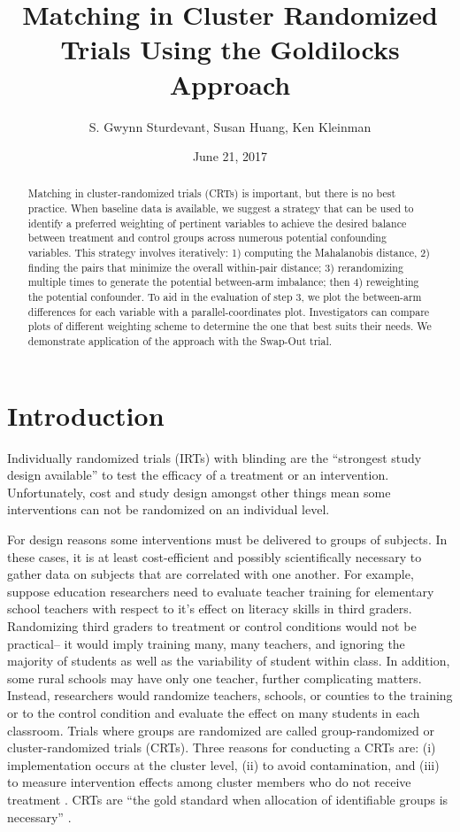 \documentclass[]{article}
\title{Matching in Cluster Randomized Trials Using the Goldilocks Approach}
\author{S. Gwynn Sturdevant, Susan Huang, Ken Kleinman}
\date{June 21, 2017}
\begin{document}
\maketitle
\begin{abstract}
Matching in cluster-randomized trials (CRTs) is important, but there is
no best practice. When baseline data is available, we suggest a strategy
that can be used to identify a preferred weighting of pertinent
variables to achieve the desired balance between treatment and control
groups across numerous potential confounding variables. This strategy
involves iteratively: 1) computing the Mahalanobis distance, 2) finding
the pairs that minimize the overall within-pair distance; 3)
rerandomizing multiple times to generate the potential between-arm
imbalance; then 4) reweighting the potential confounder. To aid in the
evaluation of step 3, we plot the between-arm differences for each
variable with a parallel-coordinates plot. Investigators can compare
plots of different weighting scheme to determine the one that best suits
their needs. We demonstrate application of the approach with the
Swap-Out trial.
\end{abstract}

\section{Introduction}\label{introduction}

Individually randomized trials (IRTs) with blinding are the ``strongest
study design available'' \citep{gatsonis2017methods} to test the
efficacy of a treatment or an intervention. Unfortunately, cost and
study design amongst other things mean some interventions can not be
randomized on an individual level.

For design reasons some interventions must be delivered to groups of
subjects. In these cases, it is at least cost-efficient and possibly
scientifically necessary to gather data on subjects that are correlated
with one another. For example, suppose education researchers need to
evaluate teacher training for elementary school teachers with respect to
it's effect on literacy skills in third graders. Randomizing third
graders to treatment or control conditions would not be practical-- it
would imply training many, many teachers, and ignoring the majority of
students as well as the variability of student within class. In
addition, some rural schools may have only one teacher, further
complicating matters. Instead, researchers would randomize teachers,
schools, or counties to the training or to the control condition and
evaluate the effect on many students in each classroom. Trials where
groups are randomized are called group-randomized or cluster-randomized
trials (CRTs). Three reasons for conducting a CRTs are: (i)
implementation occurs at the cluster level, (ii) to avoid contamination,
and (iii) to measure intervention effects among cluster members who do
not receive treatment \citep{balzer2012match, CRTrials2009}. CRTs are
``the gold standard when allocation of identifiable groups is
necessary'' \citep{murray2004design}.
\end{document}
